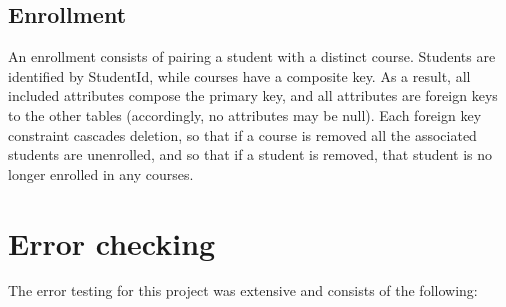 \documentclass{article}      %
\begin{document}
\subsection*{Enrollment}
An enrollment consists of pairing a student with a distinct course.
Students are identified by StudentId, while courses have a composite key.
As a result, all included attributes compose the primary key, and all attributes are foreign
keys to the other tables (accordingly, no attributes may be null).
Each foreign key constraint cascades deletion, so that if a course is
removed all the associated students are unenrolled, and so that if a student is removed,
that student is no longer enrolled in any courses.

\section*{Error checking}
The error testing for this project was extensive and consists of the following:
\end{document}
